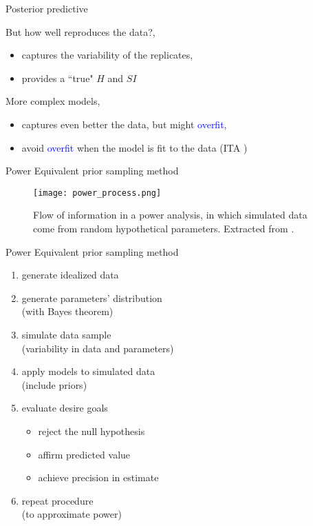 \begin{lhframe}[rhgraphic={\texttt{[image: posterior\_predictive.pdf]}}]
	{Posterior predictive}
	
	But how well reproduces the data?,
	\begin{itemize}
		\item captures the variability of the replicates,
		\item provides a ``true" $H$ and $SI$
	\end{itemize}
	
	More complex models, 
	\begin{itemize}
		\item captures even better the data, but might \textcolor{blue}{overfit},
		\item avoid \textcolor{blue}{overfit} when the model is fit to the data (ITA \cite{Anderson_2008, Chamberlain_1965})
	\end{itemize}
\end{lhframe}
%
%
\begin{frame}
	{Power}
	{Equivalent prior sampling method \cite{Winkler_1967, Kruschke_2014}} 
	
	\begin{figure}
		\texttt{[image: power\_process.png]}
		\caption{ Flow of information in a power analysis, in which simulated data come from random hypothetical parameters. Extracted from \citet{Kruschke_2014}. }
	\end{figure}
\end{frame}
%
%
\begin{lhframe}[rhgraphic={\texttt{[image: power\_image.jpg]}}]
	{Power}
	{Equivalent prior sampling method} 
	\begin{enumerate}
		\item generate idealized data 
		\item generate parameters' distribution \\
		\small{(with Bayes theorem)}
		\item simulate data sample \\
		\small{ (variability in data and parameters) }
		\item apply models to simulated data \\
		\small{ (include priors) }
		\item evaluate desire goals
		\begin{itemize}
			\item reject the null hypothesis
			\item affirm predicted value
			\item achieve precision in estimate
		\end{itemize}
		\item repeat procedure \\
		\small{ (to approximate power) }
	\end{enumerate}
\end{lhframe}
